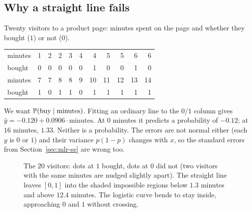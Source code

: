 \subsection{Why a straight line fails}

Twenty visitors to a product page: minutes spent on the page and whether they bought
($1$) or not ($0$).

\begin{center}
\begin{tabular}{l*{10}{r}}
\toprule
minutes & 1 & 2 & 2 & 3 & 4 & 4 & 5 & 5 & 6 & 6\\
bought  & 0 & 0 & 0 & 0 & 0 & 1 & 0 & 0 & 1 & 0\\
\midrule
minutes & 7 & 7 & 8 & 8 & 9 & 10 & 11 & 12 & 13 & 14\\
bought  & 1 & 0 & 1 & 1 & 0 & 1 & 1 & 1 & 1 & 1\\
\bottomrule
\end{tabular}
\end{center}

We want $\operatorname{\mathbb{P}}(\text{buy}\mid\text{minutes})$. Fitting an ordinary line to the $0$/$1$
column gives $\hat y = -0.120 + 0.0906\cdot\text{minutes}$. At $0$ minutes it predicts a
probability of $-0.12$; at $16$ minutes, $1.33$. Neither is a probability. The errors are
not normal either (each $y$ is $0$ or $1$) and their variance $p(1-p)$ changes with $x$,
so the standard errors from Section~\ref{sec:mlr-se} are wrong too.

\begin{figure}[H]
\centering
{}
\caption{The $20$ visitors: dots at $1$ bought, dots at $0$ did not (two visitors with the same
minutes are nudged slightly apart). The straight line leaves $[0,1]$ into the shaded
impossible regions below $1.3$ minutes and above $12.4$ minutes. The logistic curve bends
to stay inside, approaching $0$ and $1$ without crossing.}
\label{fig:logit-vs-linear}
\end{figure}

